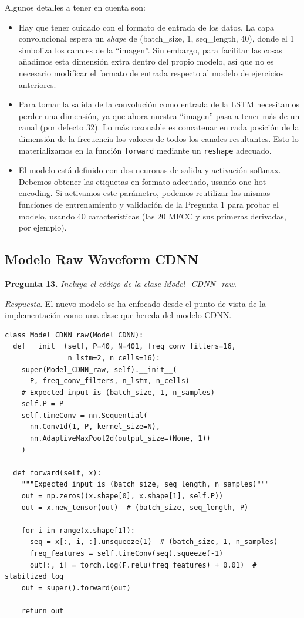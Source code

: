 \documentclass[11pt]{article}
\begin{document}
Algunos detalles a tener en cuenta son:
\begin{itemize}
  \item Hay que tener cuidado con el formato de entrada de los datos. La capa convolucional espera un \textit{shape} de (batch\_size, 1, seq\_length, 40), donde el 1 simboliza los canales de la ``imagen''. Sin embargo, para facilitar las cosas añadimos esta dimensión extra dentro del propio modelo, así que no es necesario modificar el formato de entrada respecto al modelo de ejercicios anteriores.
  \item Para tomar la salida de la convolución como entrada de la LSTM necesitamos perder una dimensión, ya que ahora nuestra ``imagen'' pasa a tener más de un canal (por defecto 32). Lo más razonable es concatenar en cada posición de la dimensión de la frecuencia los valores de todos los canales resultantes. Esto lo materializamos en la función \texttt{forward} mediante un \texttt{reshape} adecuado.
  \item El modelo está definido con dos neuronas de salida y activación softmax. Debemos obtener las etiquetas en formato adecuado, usando one-hot encoding. Si activamos este parámetro, podemos reutilizar las mismas funciones de entrenamiento y validación de la Pregunta 1 para probar el modelo, usando 40 características (las 20 MFCC y sus primeras derivadas, por ejemplo).
\end{itemize}


\subsection{Modelo Raw Waveform CDNN}

\textbf{Pregunta 13.} \textit{Incluya el código de la clase Model\_CDNN\_raw}.

\textit{Respuesta}. El nuevo modelo se ha enfocado desde el punto de vista de la implementación como una clase que hereda del modelo CDNN.

\begin{verbatim}
class Model_CDNN_raw(Model_CDNN):
  def __init__(self, P=40, N=401, freq_conv_filters=16,
               n_lstm=2, n_cells=16):
    super(Model_CDNN_raw, self).__init__(
      P, freq_conv_filters, n_lstm, n_cells)
    # Expected input is (batch_size, 1, n_samples)
    self.P = P
    self.timeConv = nn.Sequential(
      nn.Conv1d(1, P, kernel_size=N),
      nn.AdaptiveMaxPool2d(output_size=(None, 1))
    )

  def forward(self, x):
    """Expected input is (batch_size, seq_length, n_samples)"""
    out = np.zeros((x.shape[0], x.shape[1], self.P))
    out = x.new_tensor(out)  # (batch_size, seq_length, P)

    for i in range(x.shape[1]):
      seq = x[:, i, :].unsqueeze(1)  # (batch_size, 1, n_samples)
      freq_features = self.timeConv(seq).squeeze(-1)
      out[:, i] = torch.log(F.relu(freq_features) + 0.01)  # stabilized log
    out = super().forward(out)

    return out
\end{verbatim}
\end{document}
